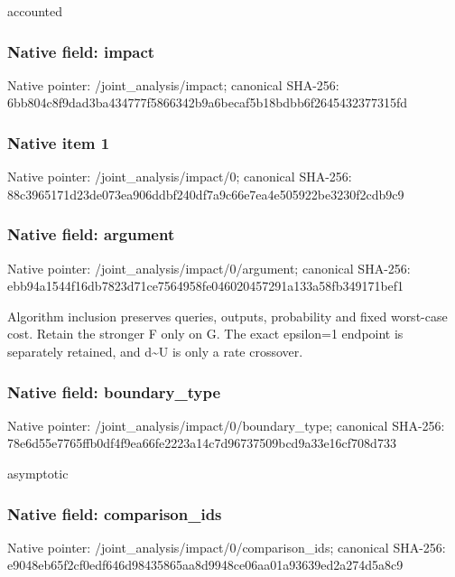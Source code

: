 \documentclass[10pt,a4paper]{article}
\begin{document}
\begingroup\raggedright\sloppy accounted\par\endgroup

\subsubsection{Native field: impact}
Native pointer: /joint\_\allowbreak{}analysis/impact; canonical SHA-256: 6bb804c8f9dad3ba434777f5866342b9a6becaf5b18bdbb6f2645432377315fd

\subsubsection{Native item 1}
Native pointer: /joint\_\allowbreak{}analysis/impact/0; canonical SHA-256: 88c3965171d23de073ea906ddbf240df7a9c66e7ea4e505922be3230f2cdb9c9

\subsubsection{Native field: argument}
Native pointer: /joint\_\allowbreak{}analysis/impact/0/argument; canonical SHA-256: ebb94a1544f16db7823d71ce7564958fe046020457291a133a58fb349171bef1

\begingroup\raggedright\sloppy Algorithm inclusion preserves queries,\allowbreak{} outputs,\allowbreak{} probability and fixed worst-case cost. Retain the stronger F only on G. The exact epsilon=\allowbreak{}1 endpoint is separately retained,\allowbreak{} and d\textasciitilde{}U is only a rate crossover.\par\endgroup

\subsubsection{Native field: boundary\_\allowbreak{}type}
Native pointer: /joint\_\allowbreak{}analysis/impact/0/boundary\_\allowbreak{}type; canonical SHA-256: 78e6d55e7765ffb0df4f9ea66fe2223a14c7d96737509bcd9a33e16cf708d733

\begingroup\raggedright\sloppy asymptotic\par\endgroup

\subsubsection{Native field: comparison\_\allowbreak{}ids}
Native pointer: /joint\_\allowbreak{}analysis/impact/0/comparison\_\allowbreak{}ids; canonical SHA-256: e9048eb65f2cf0edf646d98435865aa8d9948ce06aa01a93639ed2a274d5a8c9
\end{document}
